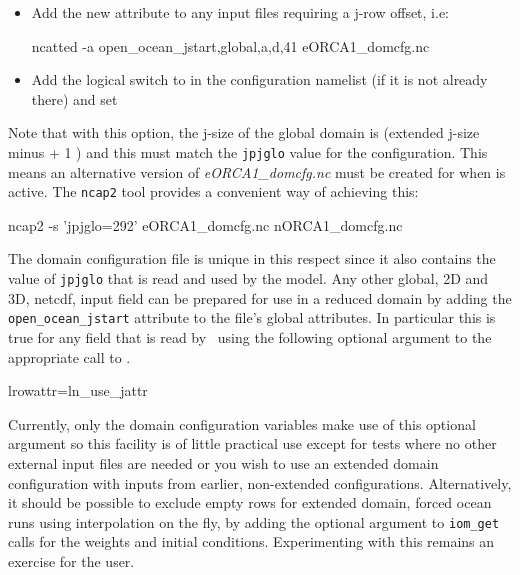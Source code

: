 \documentclass[../main/NEMO_manual]{subfiles}
\begin{document}
\begin{itemize}
\item Add the new attribute to any input files requiring a j-row offset, i.e:
\begin{cmds}
ncatted  -a open_ocean_jstart,global,a,d,41 eORCA1_domcfg.nc
\end{cmds}

\item Add the logical switch  to  in the configuration
namelist (if it is not already there) and set 
\end{itemize}

\noindent Note that with this option, the j-size of the global domain is (extended
j-size minus  + 1 ) and this must match the \texttt{jpjglo} value
for the configuration. This means an alternative version of \textit{eORCA1\_domcfg.nc} must
be created for when  is active. The \texttt{ncap2} tool provides a
convenient way of achieving this:

\begin{cmds}
ncap2 -s 'jpjglo=292' eORCA1_domcfg.nc nORCA1_domcfg.nc
\end{cmds}

The domain configuration file is unique in this respect since it also contains the value of \texttt{jpjglo}
that is read and used by the model.
Any other global, 2D and 3D, netcdf, input field can be prepared for use in a reduced domain by adding the
\texttt{open\_ocean\_jstart} attribute to the file's global attributes.
In particular this is true for any field that is read by \NEMO\ using the following optional argument to
the appropriate call to .

\begin{forlines}
lrowattr=ln_use_jattr
\end{forlines}

Currently, only the domain configuration variables make use of this optional argument so
this facility is of little practical use except for tests where no other external input
files are needed or you wish to use an extended domain configuration with inputs from
earlier, non-extended configurations. Alternatively, it should be possible to exclude
empty rows for extended domain, forced ocean runs using interpolation on the fly, by
adding the optional argument to \texttt{iom\_get} calls for the weights and initial
conditions. Experimenting with this remains an exercise for the user.
\end{document}
